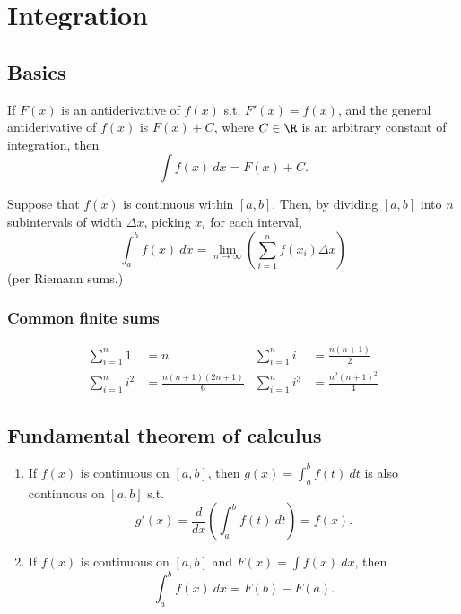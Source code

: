 \documentclass[main.tex]{subfiles}
\begin{document}
\section{Integration}
	\subsection*{Basics}
	\begin{definition}
	If \(F(x)\) is an antiderivative of \(f(x)\) s.t. \(F'(x) = f(x)\),
	and the general antiderivative of \(f(x)\) is \(F(x) + C\),
	where \(C \in \R\) is an arbitrary constant of integration,
	then \[\int f(x) \ dx = F(x) + C.\]
	\end{definition}

	\begin{definition}
	Suppose that \(f(x)\) is continuous within \([a, b]\). Then, by dividing \([a, b]\) into \(n\) subintervals of width \(\Delta x\), picking \(x_i\) for each interval,
	\[\int_{a}^b f(x) \ dx = \lim_{n \to \infty}{\left(\sum_{i = 1}^n f(x_i) \Delta x  \right)}\] (per Riemann sums.)
	\end{definition}

	\subsubsection*{Common finite sums}
	\begin{align*}
	\sum_{i = 1}^n 1 &= n & \sum_{i = 1}^n i &= \frac{n(n + 1)}{2} \\
	\sum_{i = 1}^n i^2 &= \frac{n(n + 1)(2n + 1)}{6} & \sum_{i = 1}^n i^3 &= \frac{n^2(n + 1)^2}{4}
	\end{align*}

	\subsection*{Fundamental theorem of calculus}
	\begin{enumerate}
	\item If \(f(x)\) is continuous on \([a, b]\), then
	\(g(x) = \int_a^b f(t) \ dt\) is also continuous on \([a, b]\) s.t.
	\[g'(x) = \frac{d}{dx} \left(\int_a^b f(t) \ dt \right) = f(x).\]
	\item If \(f(x)\) is continuous on \([a, b]\) and \(F(x) = \int f(x) \ dx\), then
	\[\int_a^b f(x) \ dx = F(b) - F(a).\]
	\end{enumerate}
\end{document}
